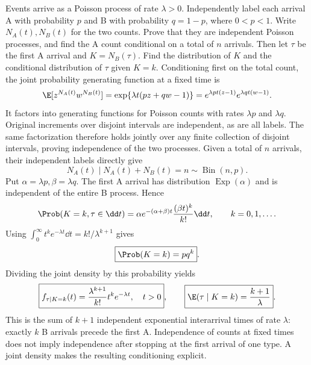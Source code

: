 Events arrive as a Poisson process of rate $\lambda>0$. Independently label each arrival A with probability $p$ and B with probability $q=1-p$, where $0<p<1$. Write $N_A(t),N_B(t)$ for the two counts. Prove that they are independent Poisson processes, and find the A count conditional on a total of $n$ arrivals. Then let $\tau$ be the first A arrival and $K=N_B(\tau)$. Find the distribution of $K$ and the conditional distribution of $\tau$ given $K=k$.
\solution Conditioning first on the total count, the joint probability generating function at a fixed time is
\[
 \E[z^{N_A(t)}w^{N_B(t)}]
 =\exp\{\lambda t(pz+qw-1)\}
 =e^{\lambda pt(z-1)}e^{\lambda qt(w-1)}.
\]
It factors into generating functions for Poisson counts with rates $\lambda p$ and $\lambda q$. Original increments over disjoint intervals are independent, as are all labels. The same factorization therefore holds jointly over any finite collection of disjoint intervals, proving independence of the two processes. Given a total of $n$ arrivals, their independent labels directly give
\[
 \boxed{N_A(t)\mid N_A(t)+N_B(t)=n\sim\operatorname{Bin}(n,p)}.
\]
Put $\alpha=\lambda p,\beta=\lambda q$. The first A arrival has distribution $\operatorname{Exp}(\alpha)$ and is independent of the entire B process. Hence
\[
 \Prob(K=k,\tau\in\dd t)
 =\alpha e^{-(\alpha+\beta)t}\frac{(\beta t)^k}{k!}\dd t,
 \qquad k=0,1,\ldots.
\]
Using $\int_0^\infty t^ke^{-\lambda t}\dd t=k!/\lambda^{k+1}$ gives
\[
 \boxed{\Prob(K=k)=pq^k}.
\]
Dividing the joint density by this probability yields
\[
 \boxed{f_{\tau\mid K=k}(t)=\frac{\lambda^{k+1}}{k!}t^ke^{-\lambda t},\quad t>0},
 \qquad \boxed{\E(\tau\mid K=k)=\frac{k+1}{\lambda}}.
\]
This is the sum of $k+1$ independent exponential interarrival times of rate $\lambda$: exactly $k$ B arrivals precede the first A.
\insight Independence of counts at fixed times does not imply independence after stopping at the first arrival of one type. A joint density makes the resulting conditioning explicit.

